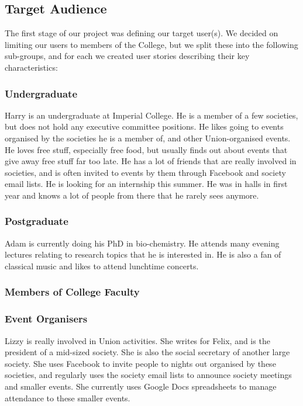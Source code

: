\documentclass[11pt]{article}
\begin{document}
\subsection {Target Audience}

The first stage of our project was defining our target user(s). We decided on limiting our users to members of the College, but we split these into the following sub-groups, and for each we created user stories describing their key characteristics:

\subsubsection{Undergraduate}
Harry is an undergraduate at Imperial College. He is a member of a few societies, but does not hold any executive committee positions. He likes going to events organised by the societies he is a member of, and other Union-organised events. He loves free stuff, especially free food, but usually finds out about events that give away free stuff far too late. He has a lot of friends that are really involved in societies, and is often invited to events by them through Facebook and society email lists. He is looking for an internship this summer. He was in halls in first year and knows a lot of people from there that he rarely sees anymore.

\subsubsection{Postgraduate}
Adam is currently doing his PhD in bio-chemistry. He attends many evening lectures relating to research topics that he is interested in. He is also a fan of classical music and likes to attend lunchtime concerts.

\subsubsection{Members of College Faculty}
\subsubsection{Event Organisers}
Lizzy is really involved in Union activities. She writes for Felix, and is the president of a mid-sized society. She is also the social secretary of another large society. She uses Facebook to invite people to nights out organised by these societies, and regularly uses the society email lists to announce society meetings and smaller events. She currently uses Google Docs spreadsheets to manage attendance to these smaller events.
\end{document}
